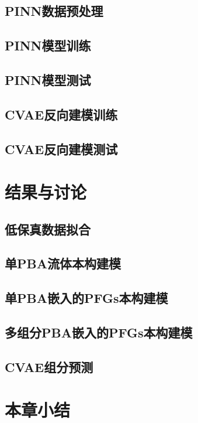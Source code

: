 \subsection{PINN数据预处理}
\subsection{PINN模型训练}
\subsection{PINN模型测试}
\subsection{CVAE反向建模训练}
\subsection{CVAE反向建模测试}

\section{结果与讨论}
\subsection{低保真数据拟合}
\subsection{单PBA流体本构建模}
\subsection{单PBA嵌入的PFGs本构建模}
\subsection{多组分PBA嵌入的PFGs本构建模}
\subsection{CVAE组分预测}

\section{本章小结}